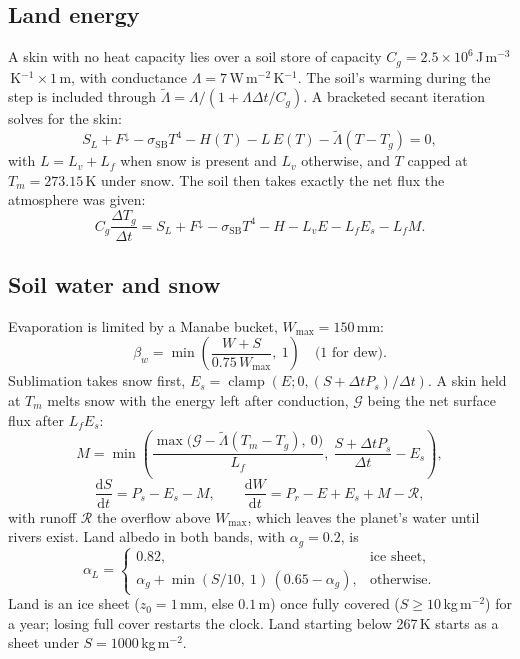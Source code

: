 \documentclass[11pt,a4paper]{article}
\newcommand{\dd}{\mathrm{d}}
\newcommand{\dv}[2]{\frac{\dd #1}{\dd #2}}
\newcommand{\clamp}{\operatorname{clamp}}
\begin{document}
\subsection{Land energy}
A skin with no heat capacity lies over a soil store of capacity
$C_g = 2.5\times10^6$\,J\,m$^{-3}$\,K$^{-1}\times 1$\,m, with conductance
$\Lambda = 7$\,W\,m$^{-2}$\,K$^{-1}$. The soil's warming during the step is included
through $\tilde\Lambda = \Lambda/(1 + \Lambda\Delta t/C_g)$. A bracketed secant
iteration solves for the skin:
\begin{equation}
S_L + F^\downarrow - \sigma_{\mathrm{SB}}T^4 - H(T) - L\,E(T) - \tilde\Lambda(T - T_g) = 0,
\end{equation}
with $L = L_v + L_f$ when snow is present and $L_v$ otherwise, and $T$ capped at
$T_m = 273.15$\,K under snow. The soil then takes exactly the net flux the atmosphere
was given:
\begin{equation}
C_g\frac{\Delta T_g}{\Delta t} = S_L + F^\downarrow - \sigma_{\mathrm{SB}}T^4 - H - L_vE
   - L_f E_s - L_f M .
\end{equation}

\subsection{Soil water and snow}
Evaporation is limited by a Manabe bucket, $W_{\max} = 150$\,mm:
\begin{equation}
\beta_w = \min\!\left(\frac{W + S}{0.75\,W_{\max}},\ 1\right)
\quad\text{(1 for dew)}.
\end{equation}
Sublimation takes snow first, $E_s = \clamp(E; 0, (S + \Delta t P_s)/\Delta t)$. A skin
held at $T_m$ melts snow with the energy left after conduction, $\mathcal{G}$
being the net surface flux after $L_f E_s$:
\begin{equation}
M = \min\!\left(\frac{\max\bigl(\mathcal{G} - \tilde\Lambda(T_m - T_g),\ 0\bigr)}{L_f},\
   \frac{S + \Delta tP_s}{\Delta t} - E_s\right),
\end{equation}
\begin{equation}
\dv{S}{t} = P_s - E_s - M, \qquad
\dv{W}{t} = P_r - E + E_s + M - \mathcal{R},
\end{equation}
with runoff $\mathcal{R}$ the overflow above $W_{\max}$, which leaves the planet's
water until rivers exist. Land albedo in both bands, with
$\alpha_g = 0.2$, is
\begin{equation}
\alpha_L = \begin{cases}
0.82, & \text{ice sheet},\\
\alpha_g + \min(S/10,\ 1)\,(0.65 - \alpha_g), & \text{otherwise}.
\end{cases}
\end{equation}
Land is an ice sheet ($z_0 = 1$\,mm, else $0.1$\,m) once fully covered ($S \ge
10$\,kg\,m$^{-2}$) for a year; losing full cover restarts the clock. Land starting
below 267\,K starts as a sheet under $S = 1000$\,kg\,m$^{-2}$.
\end{document}
